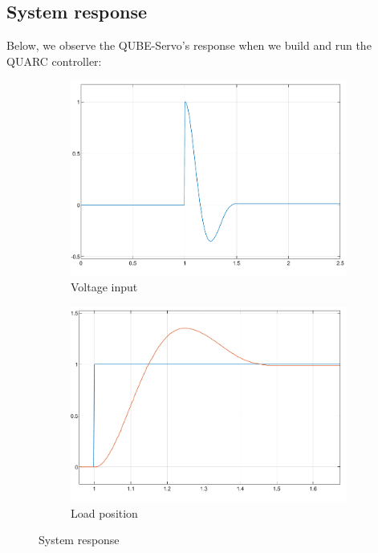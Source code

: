 \documentclass{article}
\begin{document}
\subsection{System response}
Below, we observe the QUBE-Servo's response when we build and run the QUARC controller:
\begin{figure}[H]
    \centering
    \begin{subfigure}[b]{0.45\linewidth}
        \centering
        \includegraphics[width=\linewidth]{voltage.png}
        \caption{Voltage input}
        \label{fig:voltage}
    \end{subfigure}
    \hfill
    \begin{subfigure}[b]{0.45\linewidth}
        \centering
        \includegraphics[width=\linewidth]{position.png}
        \caption{Load position}
        \label{fig:position}
    \end{subfigure}
    \caption{System response}
    \label{fig:response}
\end{figure}
\end{document}
